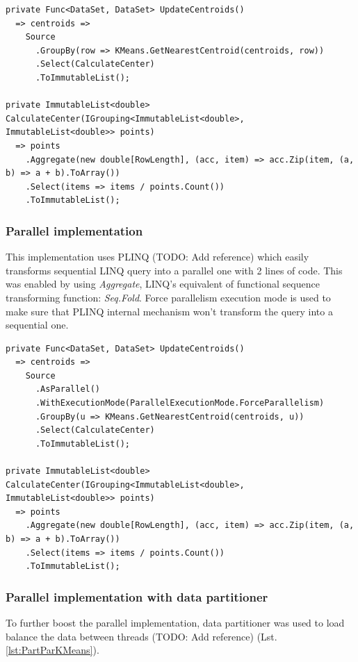 \begin{lstlisting}[language={[sharp]c}, style=sharpcstyle, caption={Sequential k-means algorithm}, label={lst:SeqKMeans}]
private Func<DataSet, DataSet> UpdateCentroids()
  => centroids =>
    Source
      .GroupBy(row => KMeans.GetNearestCentroid(centroids, row))
      .Select(CalculateCenter)
      .ToImmutableList();

private ImmutableList<double> CalculateCenter(IGrouping<ImmutableList<double>, ImmutableList<double>> points) 
  => points
    .Aggregate(new double[RowLength], (acc, item) => acc.Zip(item, (a, b) => a + b).ToArray())
    .Select(items => items / points.Count())
    .ToImmutableList();
\end{lstlisting}

\subsubsection{Parallel implementation}

This  implementation uses PLINQ (TODO: Add reference) which easily transforms sequential LINQ query into a parallel one with 2 lines of code.
This was enabled by using \emph{Aggregate}, LINQ's equivalent of functional sequence transforming function: \emph{Seq.Fold}. Force parallelism execution mode is used to make sure that PLINQ internal mechanism won't transform the query into a sequential one.

\begin{lstlisting}[language={[sharp]c}, style=sharpcstyle, caption={Parallel k-means algorithm}, label={lst:ParKMeans}]
private Func<DataSet, DataSet> UpdateCentroids()
  => centroids =>
    Source
      .AsParallel()
      .WithExecutionMode(ParallelExecutionMode.ForceParallelism)
      .GroupBy(u => KMeans.GetNearestCentroid(centroids, u))
      .Select(CalculateCenter)
      .ToImmutableList();

private ImmutableList<double> CalculateCenter(IGrouping<ImmutableList<double>, ImmutableList<double>> points)
  => points
    .Aggregate(new double[RowLength], (acc, item) => acc.Zip(item, (a, b) => a + b).ToArray())
    .Select(items => items / points.Count())
    .ToImmutableList();
\end{lstlisting}

\subsubsection{Parallel implementation with data partitioner}

To further boost the parallel implementation, data partitioner was used to load balance the data between threads (TODO: Add reference) (Lst. \ref{lst:PartParKMeans}). 

